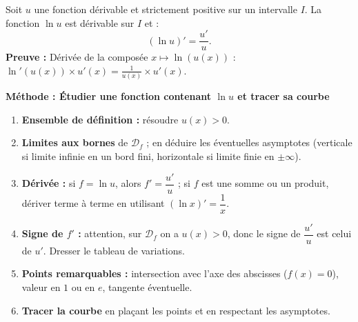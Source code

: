 \documentclass[11pt]{article}
\newcommand{\cle}[1]{{\popxbold\color{popdark}#1}}
\begin{document}
\begin{propriete}[Dérivée de $\ln u$]
Soit $u$ une fonction dérivable et strictement positive sur un intervalle $I$.
La fonction $\ln u$ est dérivable sur $I$ et :
\[ (\ln u)' = \frac{u'}{u}. \]
\textbf{Preuve :} Dérivée de la composée $x \mapsto \ln(u(x))$ : $\ln'(u(x)) \times u'(x) = \frac{1}{u(x)} \times u'(x)$.
\end{propriete}

\textbf{Méthode : Étudier une fonction contenant $\ln u$ et tracer sa courbe}\par
\begin{methode}
\begin{enumerate}
\item \textbf{Ensemble de définition :} résoudre $u(x)>0$.
\item \textbf{Limites aux bornes} de $\mathcal{D}_f$ ; en déduire les éventuelles \cle{asymptotes} (verticale si limite infinie en un bord fini, horizontale si limite finie en $\pm\infty$).
\item \textbf{Dérivée :} si $f=\ln u$, alors $f'=\dfrac{u'}{u}$ ; si $f$ est une somme ou un produit, dériver terme à terme en utilisant $(\ln x)'=\dfrac{1}{x}$.
\item \textbf{Signe de $f'$ :} attention, sur $\mathcal{D}_f$ on a $u(x)>0$, donc le signe de $\dfrac{u'}{u}$ est celui de $u'$. Dresser le tableau de variations.
\item \textbf{Points remarquables :} intersection avec l'axe des abscisses ($f(x)=0$), valeur en $1$ ou en $e$, tangente éventuelle.
\item \textbf{Tracer la courbe} en plaçant les points et en respectant les asymptotes.
\end{enumerate}
\end{methode}
\end{document}
